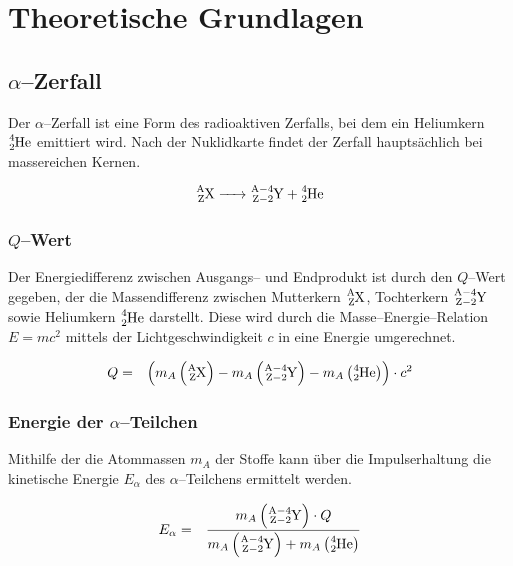 \documentclass[12pt,a4paper]{scrartcl}
\numberwithin{equation}{section} %
\begin{document}
\clearpage
\hypertarget{theoretische-grundlagen}{%
\section{Theoretische Grundlagen}\label{theoretische-grundlagen}}

\hypertarget{alpha-zerfall}{%
\subsection{$\alpha$--Zerfall}\label{alpha-zerfall}}

Der $\alpha$--Zerfall ist eine Form des radioaktiven Zerfalls, bei dem ein Heliumkern $\ce{^4_2He}$ emittiert wird. Nach der Nuklidkarte findet der Zerfall hauptsächlich bei massereichen Kernen. \cite{Chart of Nuclides}

\begin{eqnarray}
    \ce{^A_ZX -> ^{A-4}_{Z-2}Y + ^4_2He}
\end{eqnarray}

\hypertarget{q-wert}{%
\subsubsection{$Q$--Wert}\label{q-wert}}

Der Energiedifferenz zwischen Ausgangs-- und Endprodukt ist durch den $Q$--Wert gegeben, der die Massendifferenz zwischen Mutterkern $\ce{^A_ZX}$, Tochterkern $\ce{^{A-4}_{Z-2}Y}$ sowie Heliumkern $\ce{^4_2He}$ darstellt. Diese wird durch die Masse--Energie--Relation $E=mc^2$ mittels der Lichtgeschwindigkeit $c$ in eine Energie umgerechnet.

\begin{eqnarray}
    Q &=&
        \left(m_{A}
            \left(\ce{^A_ZX}\right)
            - m_{A}\left(\ce{^{A-4}_{Z-2}Y}\right)
            - m_{A}\left(\ce{^4_2He}\right)
        \right) \cdot c^2
\end{eqnarray}

\hypertarget{energie-der-alpha-teilchen}{%
\subsubsection{Energie der $\alpha$--Teilchen}\label{energie-der-alpha-teilchen}}

Mithilfe der die Atommassen $m_{A}$ der Stoffe kann über die Impulserhaltung die kinetische Energie $E_\alpha$ des $\alpha$--Teilchens ermittelt werden.

\begin{eqnarray}
    E_\alpha
        &=& \frac{m_{A}\left(\ce{^{A-4}_{Z-2}Y}\right) \cdot Q}
            {m_{A}\left(\ce{^{A-4}_{Z-2}Y}\right)+m_{A}\left(\ce{^4_2He}\right)}
\end{eqnarray}
\end{document}
